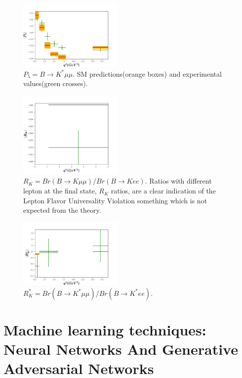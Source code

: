 \documentclass[a4paper,fleqn]{cas-dc}
\begin{document}
\begin{figure}
	\centering
	\includegraphics[width=0.45\textwidth]{images/P5.pdf}
	\caption{\(P_5 = B\rightarrow K^*\mu\mu \). SM predictions(orange boxes) and experimental values(green crosses).}
	\label{FIG:1}
\end{figure}
\begin{figure}
	\centering
	\includegraphics[width=0.45\textwidth]{images/RK.pdf}
	\caption{\(R_K = Br(B\rightarrow K\mu\mu)/ Br(B\rightarrow Kee)\). Ratios with different lepton at the final state, \(R_K\) ratios, are a clear indication of the Lepton Flavor Universality Violation something which is not expected from the theory.}
	\label{FIG:2}
\end{figure}
\begin{figure}
	\centering
	\includegraphics[width=0.45\textwidth]{images/RKStar.pdf}
	\caption{\(R_K^* = Br(B\rightarrow K^*\mu\mu)/ Br(B\rightarrow K^*ee)\). }
	\label{FIG:3}
\end{figure}

\section{Machine learning techniques: Neural Networks And Generative Adversarial Networks}
\end{document}
